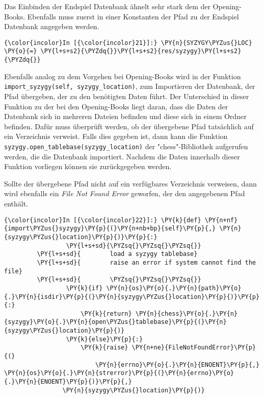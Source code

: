 Das Einbinden der Endspiel Datenbank ähnelt sehr stark dem der
Opening-Books. Ebenfalls muss zuerst in einer Konstanten der Pfad zu der
Endspiel Datenbank angegeben werden.

    \begin{Verbatim}[commandchars=\\\{\}]
{\color{incolor}In [{\color{incolor}21}]:} \PY{n}{SYZYGY\PYZus{}LOC} \PY{o}{=} \PY{l+s+s2}{\PYZdq{}}\PY{l+s+s2}{res/syzygy}\PY{l+s+s2}{\PYZdq{}}
\end{Verbatim}

    Ebenfalls analog zu dem Vorgehen bei Opening-Books wird in der Funktion
\texttt{import\_syzygy(self,\ syzygy\_location)}, zum Importieren der
Datenbank, der Pfad übergeben, der zu den benötigten Daten führt. Der
Unterschied in dieser Funktion zu der bei den Opening-Books liegt daran,
dass die Daten der Datenbank sich in mehreren Dateien befinden und diese
sich in einem Ordner befinden. Dafür muss überprüft werden, ob der
übergebene Pfad tatsächlich auf ein Verzeichnis verweist. Falls dies
gegeben ist, dann kann die Funktion
\texttt{syzygy.open\_tablebase(syzygy\_location)} der "chess"-Bibliothek
aufgerufen werden, die die Datenbank importiert. Nachdem die Daten
innerhalb dieser Funktion vorliegen können sie zurückgegeben werden.

Sollte der übergebene Pfad nicht auf ein verfügbares Verzeichnis
verweisen, dann wird ebenfalls ein \emph{File Not Found Error} geworfen,
der den angegebenen Pfad enthält.

    \begin{Verbatim}[commandchars=\\\{\}]
{\color{incolor}In [{\color{incolor}22}]:} \PY{k}{def} \PY{n+nf}{import\PYZus{}syzygy}\PY{p}{(}\PY{n+nb+bp}{self}\PY{p}{,} \PY{n}{syzygy\PYZus{}location}\PY{p}{)}\PY{p}{:}
                 \PY{l+s+sd}{\PYZsq{}\PYZsq{}\PYZsq{}}
         \PY{l+s+sd}{        load a syzygy tablebase}
         \PY{l+s+sd}{        raise an error if system cannot find the file}
         \PY{l+s+sd}{        \PYZsq{}\PYZsq{}\PYZsq{}}
                 \PY{k}{if} \PY{n}{os}\PY{o}{.}\PY{n}{path}\PY{o}{.}\PY{n}{isdir}\PY{p}{(}\PY{n}{syzygy\PYZus{}location}\PY{p}{)}\PY{p}{:}
                     \PY{k}{return} \PY{n}{chess}\PY{o}{.}\PY{n}{syzygy}\PY{o}{.}\PY{n}{open\PYZus{}tablebase}\PY{p}{(}\PY{n}{syzygy\PYZus{}location}\PY{p}{)}
                 \PY{k}{else}\PY{p}{:}
                     \PY{k}{raise} \PY{n+ne}{FileNotFoundError}\PY{p}{(}
                         \PY{n}{errno}\PY{o}{.}\PY{n}{ENOENT}\PY{p}{,} \PY{n}{os}\PY{o}{.}\PY{n}{strerror}\PY{p}{(}\PY{n}{errno}\PY{o}{.}\PY{n}{ENOENT}\PY{p}{)}\PY{p}{,} 
				\PY{n}{syzygy\PYZus{}location}\PY{p}{)}
\end{Verbatim}

